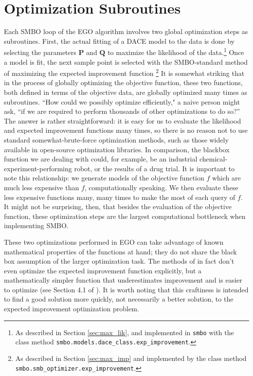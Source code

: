 \section{Optimization Subroutines}\label{sec:sub_opt}
Each SMBO loop of the EGO algorithm involves two global optimization steps as subroutines. First, the actual fitting of a DACE model to the data is done by selecting the parameters $\mathbf{P}$ and $\mathbf{Q}$ to maximize the likelihood of the data.\footnote{As described in Section \ref{sec:max_lik}, and implemented in \texttt{smbo} with the class method \texttt{smbo.models.dace\_class.exp\_improvement}.} Once a model is fit, the next sample point is selected with the SMBO-standard method of maximizing the expected improvement function \footnote{As described in Section \ref{sec:max_imp} and implemented by the class method \texttt{smbo.smb\_optimizer.exp\_improvement}.} It is somewhat striking that in the process of globally optimizing the objective function, these two functions, both defined in terms of the objective data, are globally optimized many times as subroutines. ``How could we possibly optimize efficiently," a naive person might ask, ``if we are required to perform thousands of other optimizations to do so?'' The answer is rather straightforward: it is easy for us to evaluate the likelihood and expected improvement functions many times, so there is no reason not to use standard somewhat-brute-force optimization methods, such as those widely available in open-source optimization libraries. In comparison, the blackbox function we are dealing with could, for example, be an industrial chemical-experiment-performing robot, or the results of a drug trial. It is important to note this relationship: we generate models of the objective function $f$ which are much less expensive than $f$, computationally speaking. We then evaluate these less expensive functions many, many times to make the most of each query of $f$. It might not be surprising, then, that besides the evaluation of the objective function, these optimization steps are the largest computational bottleneck when implementing SMBO.


These two optimizations performed in EGO can take advantage of known mathematical properties of the functions at hand; they do not share the black box assumption of the larger optimization task. The methods of \cite{jones_efficient_1998} in fact don't even optimize the expected improvement function explicitly, but a mathematically simpler function that underestimates improvement and is easier to optimize (see Section 4.1 of \cite{jones_efficient_1998}). It is worth noting that this craftiness is intended to find a good solution more quickly, not necessarily a better solution, to the expected improvement optimization problem. 

